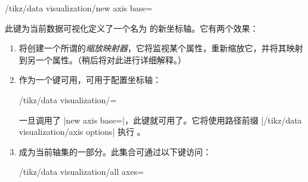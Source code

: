 \begin{key}{/tikz/data visualization/new axis base=} %

    此键为当前数据可视化定义了一个名为  的新坐标轴。它有两个效果：
    \begin{enumerate}
        \item 将创建一个所谓的\emph{缩放映射器}，它将监视某个属性，重新缩放它，并将其映射到另一个属性。（稍后将对此进行详细解释。）
        \item {} 作为一个键可用，可用于配置坐标轴：
            \begin{key}{/tikz/data visualization/=} %

                一旦调用了 |new axis base=|，此键就可用了。它将使用路径前缀 |/tikz/data visualization/axis options| 执行 。
\begin{codeexample}
\end{codeexample}
            \end{key}
        \item {} 成为当前轴集的一部分。此集合可通过以下键访问：
            \begin{key}{/tikz/data visualization/all axes=} %


\end{key}
\end{enumerate}
\end{key}
